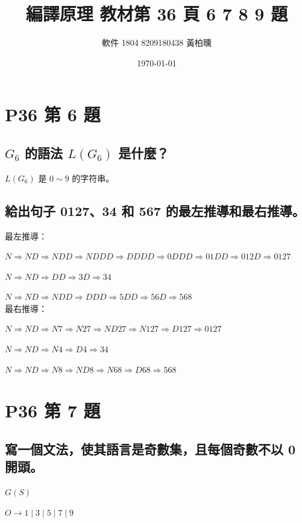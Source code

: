 \documentclass[12pt, a4paper]{article}
\author{軟件 1804 8209180438 黃柏曛}
\date{\today}
\title{編譯原理 教材第 36 頁 6 7 8 9 題}
\begin{document}
\maketitle
\section{P36 第 6 題}
    \subsection{$G_{6}$ 的語法 $L(G_{6})$ 是什麼？}
    
    $L(G_{6})$ 是 $0\sim9$ 的字符串。

    \subsection{給出句子 0127、34 和 567 的最左推導和最右推導。}

    {最左推導：}

    {\footnotesize $N \Rightarrow ND \Rightarrow NDD \Rightarrow NDDD \Rightarrow DDDD \Rightarrow 0DDD \Rightarrow 01DD \Rightarrow 012D \Rightarrow 0127$}

    {\footnotesize $N \Rightarrow ND \Rightarrow DD \Rightarrow 3D \Rightarrow 34$}

    {\footnotesize $N \Rightarrow ND \Rightarrow NDD \Rightarrow DDD \Rightarrow 5DD \Rightarrow 56D \Rightarrow 568$ }\\

    {最右推導：}
    
    {\footnotesize $N \Rightarrow ND \Rightarrow N7 \Rightarrow N27 \Rightarrow ND27 \Rightarrow N127 \Rightarrow D127 \Rightarrow 0127$ }
    
    {\footnotesize $N \Rightarrow ND \Rightarrow N4 \Rightarrow D4 \Rightarrow 34$}
    
    {\footnotesize $N \Rightarrow ND \Rightarrow N8 \Rightarrow ND8 \Rightarrow N68 \Rightarrow D68 \Rightarrow 568$}

\section{P36 第 7 題}
    \subsection{寫一個文法，使其語言是奇數集，且每個奇數不以 0 開頭。}

    {$G(S)$}

    {$O \rightarrow 1 \mid 3 \mid 5 \mid 7 \mid 9$}
\end{document}
